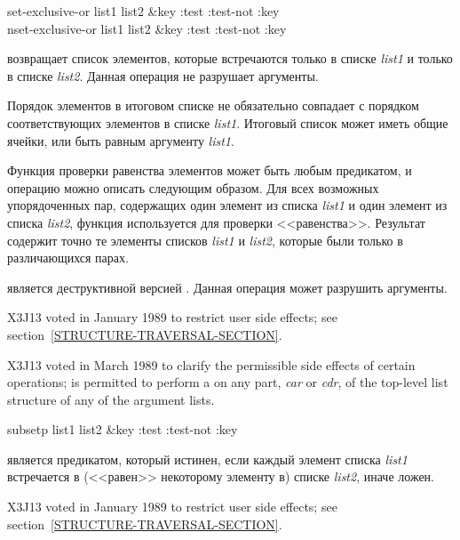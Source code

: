 \begin{defun}[Функция]
set-exclusive-or list1 list2 &key :test :test-not :key \\
nset-exclusive-or list1 list2 &key :test :test-not :key

 возвращает список элементов, которые встречаются только в
списке \emph{list1} и только в списке \emph{list2}.
Данная операция не разрушает аргументы.

Порядок элементов в итоговом списке не обязательно совпадает с порядком
соответствующих элементов в списке \emph{list1}.
Итоговый список может иметь общие ячейки, или быть равным  аргументу
\emph{list1}.

Функция проверки равенства элементов может быть любым предикатом, и операцию
 можно описать следующим образом. Для всех возможных
упорядоченных пар, содержащих один элемент из списка \emph{list1} и один элемент
из списка \emph{list2}, функция используется для проверки
<<равенства>>. Результат содержит точно те элементы списков \emph{list1} и
\emph{list2}, которые были только в различающихся парах.

 является деструктивной версией
. Данная операция может разрушить аргументы.

\begin{new}
X3J13 voted in January 1989
to restrict user side effects; see section~\ref{STRUCTURE-TRAVERSAL-SECTION}.
\end{new}

\begin{newer}
X3J13 voted in March 1989 
to clarify the permissible side effects of certain operations;
 is permitted to perform a  on any part,
\emph{car} or \emph{cdr}, of the top-level list structure of 
any of the argument lists.
\end{newer}
\end{defun}

\begin{defun}[Функция]
subsetp list1 list2 &key :test :test-not :key

 является предикатом, который истинен, если каждый элемент списка
\emph{list1} встречается в (<<равен>> некоторому элементу в) списке
\emph{list2}, иначе ложен.

\begin{new}
X3J13 voted in January 1989
to restrict user side effects; see section~\ref{STRUCTURE-TRAVERSAL-SECTION}.
\end{new}
\end{defun}

